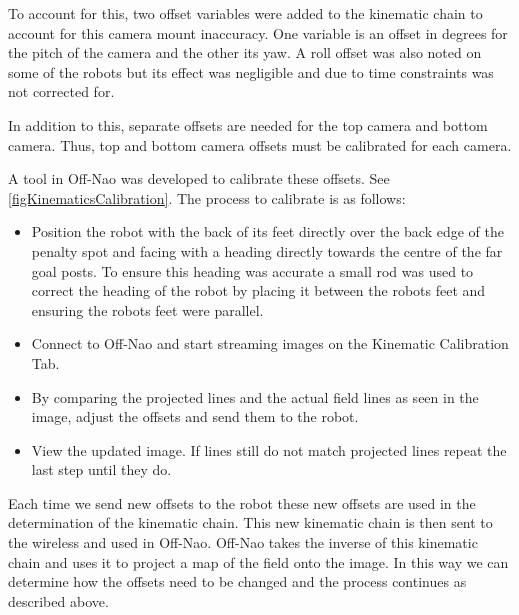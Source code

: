 \documentclass[pdftex,11pt,a4paper]{report}
\begin{document}
To account for this, two offset variables were added to the kinematic chain to account for this camera mount inaccuracy. One variable is an offset in degrees for the pitch of the camera and the other its yaw. A roll offset was also noted on some of the robots but its effect was negligible and due to time constraints was not corrected for.

In addition to this, separate offsets are needed for the top camera and bottom camera. Thus, top and bottom camera offsets must be calibrated for each camera.

A tool in Off-Nao was developed to calibrate these offsets. See \autoref{figKinematicsCalibration}. The process to calibrate is as follows:
\begin{itemize}
\item Position the robot with the back of its feet directly over the back edge of the penalty spot and facing with a heading directly towards the centre of the far goal posts. To ensure this heading was accurate a small rod was used to correct the heading of the robot by placing it between the robots feet and ensuring the robots feet were parallel.
\item Connect to Off-Nao and start streaming images on the Kinematic Calibration Tab.
\item By comparing the projected lines and the actual field lines as seen in the image, adjust the offsets and send them to the robot.
\item View the updated image. If lines still do not match projected lines repeat the last step until they do.
\end{itemize}

Each time we send new offsets to the robot these new offsets are used in the determination of the kinematic chain. This new kinematic chain is then sent to the wireless and used in Off-Nao. Off-Nao takes the inverse of this kinematic chain and uses it to project a map of the field onto the image. In this way we can determine how the offsets need to be changed and the process continues as described above.
\end{document}
